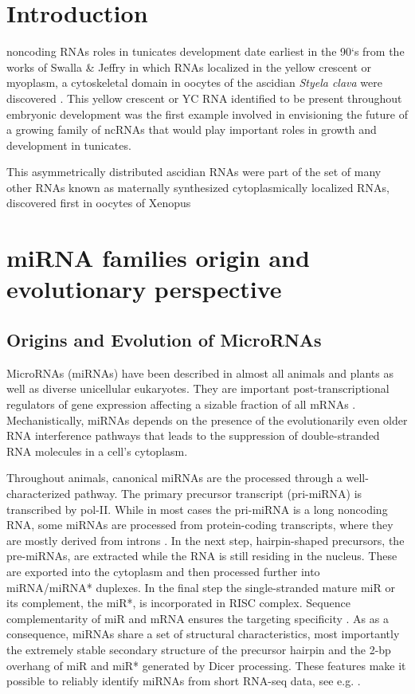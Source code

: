 \documentclass[graybox]{svmult}
\begin{document}
\section{Introduction}
\label{sec:1}

noncoding RNAs roles in tunicates development date earliest in the 90`s from the works of Swalla \& Jeffry in which RNAs localized in the yellow crescent or myoplasm, a cytoskeletal domain in oocytes of the ascidian \textit{Styela clava} were discovered \cite{Swalla1995}. This  yellow crescent or YC RNA identified to be present throughout embryonic development was the first example involved in envisioning the future of a growing family of ncRNAs that would play important roles in growth and development in tunicates\cite{Swalla1995}.

This asymmetrically distributed ascidian RNAs were part of the set of many other RNAs known as maternally synthesized cytoplasmically localized RNAs, discovered first in oocytes of Xenopus \cite{Bashirullah1998}

\section{miRNA families origin and evolutionary perspective}
\label{sec:2}

\subsection{Origins and Evolution of MicroRNAs}

MicroRNAs (miRNAs) have been described in almost all animals and plants as
well as diverse unicellular eukaryotes. They are important
post-transcriptional regulators of gene expression affecting a sizable
fraction of all mRNAs \cite{Ameres:13}. Mechanistically, miRNAs depends on
the presence of the evolutionarily even older RNA interference pathways
\cite{Cerutti:06, Shabalina:08} that leads to the suppression of
double-stranded RNA molecules in a cell's cytoplasm. 

Throughout animals, canonical miRNAs are the processed through a
well-characterized pathway. The primary precursor transcript (pri-miRNA) is
transcribed by pol-II. While in most cases the pri-miRNA is a long
noncoding RNA, some miRNAs are processed from protein-coding transcripts,
where they are mostly derived from introns \cite{Lin:06}. In the next step,
hairpin-shaped precursors, the pre-miRNAs, are extracted while the RNA is
still residing in the nucleus. These are exported into the cytoplasm
\cite{Lund:04} and then processed further into miRNA/miRNA* duplexes.  In
the final step the single-stranded mature miR or its complement, the miR*,
is incorporated in RISC complex. Sequence complementarity of miR and mRNA
ensures the targeting specificity \cite{Bartel:13}. As as a consequence,
miRNAs share a set of structural characteristics, most importantly the
extremely stable secondary structure of the precursor hairpin and the 2-bp
overhang of miR and miR* generated by Dicer processing. These features make
it possible to reliably identify miRNAs from short RNA-seq data, see e.g.
\cite{Langenberger:10a, Friedlaender:12, Langenberger:13a}.
\end{document}
